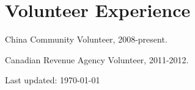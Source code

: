 \documentclass[letterpaper]{article}
\def\footerlink{}
\renewenvironment{itemize}{
  \begin{list}{}{
    \setlength{\leftmargin}{1.5em}
  }
}{
  \end{list}
}
\begin{document}
\section*{Volunteer Experience}
\begin{itemize}
\item China Community Volunteer, 2008-present.
\item Canadian Revenue Agency Volunteer, 2011-2012.
\end{itemize}

\bigskip

\begin{center}
  \begin{footnotesize}
    Last updated: \today \\
    \href{\footerlink}{\texttt{\footerlink}}
  \end{footnotesize}
\end{center}
\end{document}
